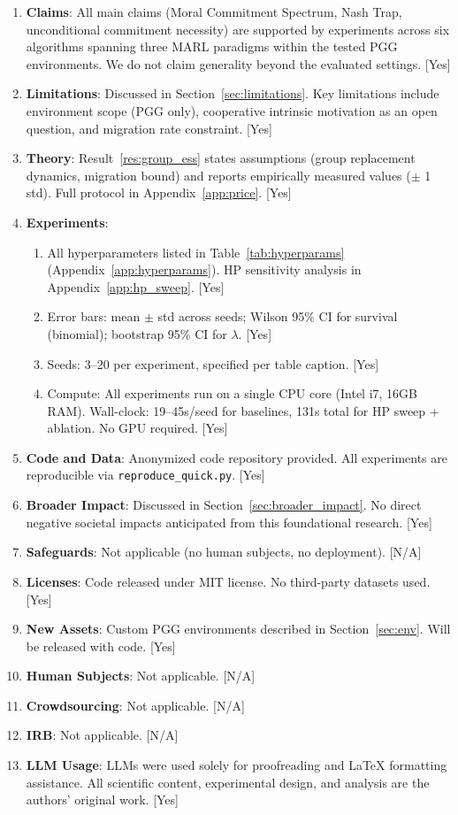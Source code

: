 \documentclass{article}
\begin{document}
\begin{enumerate}
\item \textbf{Claims}: All main claims (Moral Commitment Spectrum, Nash Trap, unconditional commitment necessity) are supported by experiments across six algorithms spanning three MARL paradigms within the tested PGG environments. We do not claim generality beyond the evaluated settings. [Yes]
\item \textbf{Limitations}: Discussed in Section~\ref{sec:limitations}. Key limitations include environment scope (PGG only), cooperative intrinsic motivation as an open question, and migration rate constraint. [Yes]
\item \textbf{Theory}: Result~\ref{res:group_ess} states assumptions (group replacement dynamics, migration bound) and reports empirically measured values ($\pm$ 1 std). Full protocol in Appendix~\ref{app:price}. [Yes]
\item \textbf{Experiments}:
  \begin{enumerate}
    \item All hyperparameters listed in Table~\ref{tab:hyperparams} (Appendix~\ref{app:hyperparams}). HP sensitivity analysis in Appendix~\ref{app:hp_sweep}. [Yes]
    \item Error bars: mean $\pm$ std across seeds; Wilson 95\% CI for survival (binomial); bootstrap 95\% CI for $\lambda$. [Yes]
    \item Seeds: 3--20 per experiment, specified per table caption. [Yes]
    \item Compute: All experiments run on a single CPU core (Intel i7, 16GB RAM). Wall-clock: 19--45s/seed for baselines, 131s total for HP sweep + ablation. No GPU required. [Yes]
  \end{enumerate}
\item \textbf{Code and Data}: Anonymized code repository provided. All experiments are reproducible via \texttt{reproduce\_quick.py}. [Yes]
\item \textbf{Broader Impact}: Discussed in Section~\ref{sec:broader_impact}. No direct negative societal impacts anticipated from this foundational research. [Yes]
\item \textbf{Safeguards}: Not applicable (no human subjects, no deployment). [N/A]
\item \textbf{Licenses}: Code released under MIT license. No third-party datasets used. [Yes]
\item \textbf{New Assets}: Custom PGG environments described in Section~\ref{sec:env}. Will be released with code. [Yes]
\item \textbf{Human Subjects}: Not applicable. [N/A]
\item \textbf{Crowdsourcing}: Not applicable. [N/A]
\item \textbf{IRB}: Not applicable. [N/A]
\item \textbf{LLM Usage}: LLMs were used solely for proofreading and LaTeX formatting assistance. All scientific content, experimental design, and analysis are the authors' original work. [Yes]
\end{enumerate}
\end{document}
